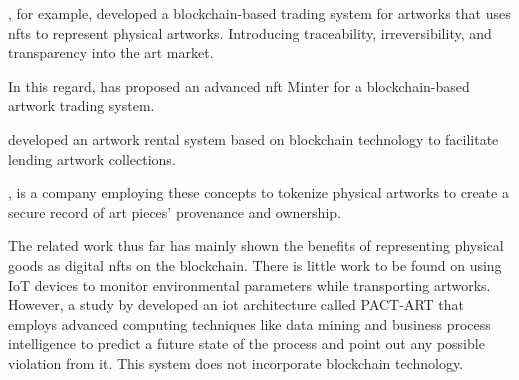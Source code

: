 \textcite{artchain}, for example, developed a blockchain-based trading system for artworks that uses \glspl{nft} to represent physical artworks. Introducing traceability, irreversibility, and transparency into the art market. 

In this regard, \textcite{nftminter} has proposed an advanced \gls{nft} Minter for a blockchain-based artwork trading system. 

\textcite{artrentalblockchain} developed an artwork rental system based on blockchain technology to facilitate lending artwork collections.

\textcite{artory}, is a company employing these concepts to tokenize physical artworks to create a secure record of art pieces' provenance and ownership. 

The related work thus far has mainly shown the benefits of representing physical goods as digital \glspl{nft} on the blockchain. There is little work to be found on using IoT devices to monitor environmental parameters while transporting artworks. However, a study by \textcite{pactart} developed an \gls{iot} architecture called PACT-ART that employs advanced computing techniques like data mining and business process intelligence to predict a future state of the process and point out any possible violation from it. This system does not incorporate blockchain technology.
